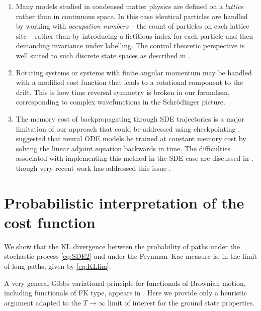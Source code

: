 \documentclass[12pt]{msml2020} %
\begin{document}
\begin{enumerate}
    \item Many models studied in condensed matter physics are defined on a \emph{lattice} rather than in continuous space. In this case identical particles are handled by working with \emph{occupation numbers} -- the count of particles on each lattice site -- rather than by introducing a fictitious index for each particle and then demanding invariance under labelling. The control theoretic perspective is well suited to such discrete state spaces as described in \cite{Todorov:2007aa}.
    \item Rotating systems or systems with finite angular momentum may be handled with a modified cost function that
    leads to a rotational component to the drift. This is how time reversal symmetry is broken in our formalism, corresponding to complex wavefunctions in the Schr\"odinger picture.
    
    \item The memory cost of backpropagating through SDE trajectories is a major limitation of our approach that could be addressed using checkpointing  \cite{Martens:2012aa,Chen:2016aa,Gruslys:2016aa}. \cite{Chen:2018aa} suggested that neural ODE models be trained at constant memory cost by solving the linear adjoint equation backwards in time. The difficulties associated with implementing this method in the SDE case are discussed in \cite{Tzen:2019aa}, though very recent work has addressed this issue \cite{li2020scalable}.
    
\end{enumerate}




\appendix

\section{Probabilistic interpretation of the cost function} \label{sec:prob-proof}

We show that the KL divergence between the probability of paths under the stochastic process \eqref{eq:SDE2} and under the Feynman--Kac measure is, in the limit of long paths, given by \eqref{eq:KLlim}.

A very general Gibbs variational principle for functionals of Brownian motion, including functionals of FK type, appears in \cite{Boue:1998aa}. Here we provide only a heuristic argument adapted to the $T\to\infty$ limit of interest for the ground state properties.
\end{document}
